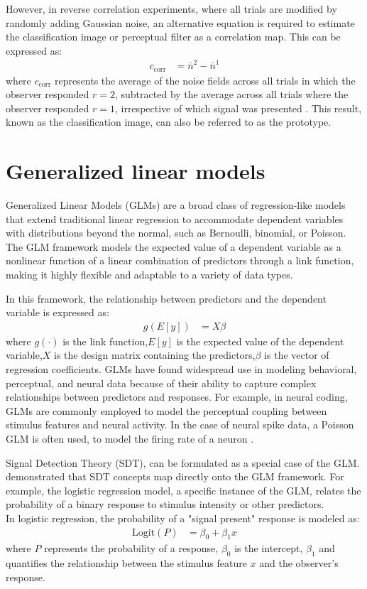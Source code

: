 However, in reverse correlation experiments, where all trials are modified by randomly adding Gaussian noise, an alternative equation is required to estimate the classification image or perceptual filter as a correlation map. This can be expressed as:
\begin{align}
c_{\text{corr}} &= \bar{n}^2 - \bar{n}^1 \label{eq:corr_map}
\end{align}
where $c_{\text{corr}}$ represents the average of the noise fields across all trials in which the observer responded $r=2$, subtracted by the average across all trials where the observer responded $r=1$, irrespective of which signal was presented \cite{murray_classification_2011}. This result, known as the classification image, can also be referred to as the prototype\cite{macke_estimating_2010}.


\section {Generalized linear models} 

Generalized Linear Models (GLMs) are a broad class of regression-like models that extend traditional linear regression to accommodate dependent variables with distributions beyond the normal, such as Bernoulli, binomial, or Poisson. The GLM framework models the expected value of a dependent variable as a nonlinear function of a linear combination of predictors through a link function, making it highly flexible and adaptable to a variety of data types.

In this framework, the relationship between predictors and the dependent variable is expressed as:
\begin{align}
g(E[y])& = X \beta
\end{align}
where $g(\cdot)$ is the link function,$E[y]$ is the expected value of the dependent variable,$X$ is the design matrix containing the predictors,$\beta$ is the vector of regression coefficients.
GLMs have found widespread use in modeling behavioral, perceptual, and neural data because of their ability to capture complex relationships between predictors and responses. For example, in neural coding, GLMs are commonly employed to model the perceptual coupling between stimulus features and neural activity. In the case of neural spike data, a Poisson GLM is often used, to model the firing rate of a neuron \cite{pillow_spatio-temporal_2008}.

Signal Detection Theory (SDT), can be formulated as a special case of the GLM.  \cite{decarlo_signal_nodate} demonstrated that SDT concepts map directly onto the GLM framework. For example, the logistic regression model, a specific instance of the GLM, relates the probability of a binary response to stimulus intensity or other predictors.\\In logistic regression, the probability of a "signal present" response is modeled as: 
\begin{align}
\text{Logit}(P)& = \beta_0 + \beta_1 x 
\end{align}
where $P$ represents the probability of a response, 
$\beta_0$ is the intercept, $\beta_1$ and  quantifies the relationship between the stimulus feature $x$ and the observer’s response.
 
